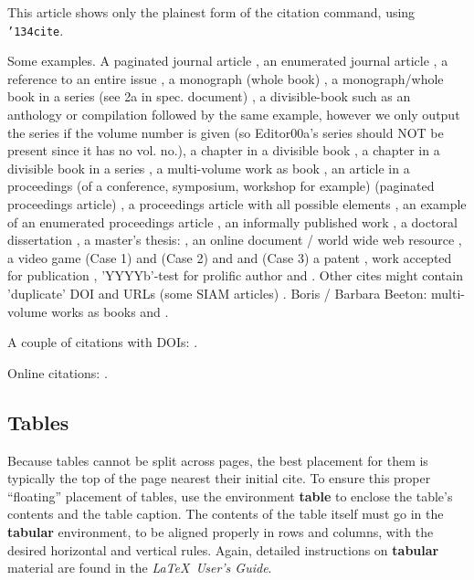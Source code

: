 This article shows only the plainest form
of the citation command, using \texttt{{\char'134}cite}.

Some examples.  A paginated journal article \cite{Abril07}, an enumerated
journal article \cite{Cohen07}, a reference to an entire issue \cite{JCohen96},
a monograph (whole book) \cite{Kosiur01}, a monograph/whole book in a series (see 2a in spec. document)
\cite{Harel79}, a divisible-book such as an anthology or compilation \cite{Editor00}
followed by the same example, however we only output the series if the volume number is given
\cite{Editor00a} (so Editor00a's series should NOT be present since it has no vol. no.),
a chapter in a divisible book \cite{Spector90}, a chapter in a divisible book
in a series \cite{Douglass98}, a multi-volume work as book \cite{Knuth97},
an article in a proceedings (of a conference, symposium, workshop for example)
(paginated proceedings article) \cite{Andler79}, a proceedings article
with all possible elements \cite{Smith10}, an example of an enumerated
proceedings article \cite{VanGundy07},
an informally published work \cite{Harel78}, a doctoral dissertation \cite{Clarkson85},
a master's thesis: \cite{anisi03}, an online document / world wide web
resource \cite{Thornburg01, Ablamowicz07, Poker06}, a video game (Case 1) \cite{Obama08} and (Case 2) \cite{Novak03}
and \cite{Lee05} and (Case 3) a patent \cite{JoeScientist001},
work accepted for publication \cite{rous08}, 'YYYYb'-test for prolific author
\cite{SaeediMEJ10} and \cite{SaeediJETC10}. Other cites might contain
'duplicate' DOI and URLs (some SIAM articles) \cite{Kirschmer:2010:AEI:1958016.1958018}.
Boris / Barbara Beeton: multi-volume works as books
\cite{MR781536} and \cite{MR781537}.

A couple of citations with DOIs: \cite{2004:ITE:1009386.1010128,
  Kirschmer:2010:AEI:1958016.1958018}. 

Online citations: \cite{TUGInstmem, Thornburg01, CTANacmart}.  


\subsection{Tables}
Because tables cannot be split across pages, the best
placement for them is typically the top of the page
nearest their initial cite.  To
ensure this proper ``floating'' placement of tables, use the
environment \textbf{table} to enclose the table's contents and
the table caption.  The contents of the table itself must go
in the \textbf{tabular} environment, to
be aligned properly in rows and columns, with the desired
horizontal and vertical rules.  Again, detailed instructions
on \textbf{tabular} material
are found in the \textit{\LaTeX\ User's Guide}.

